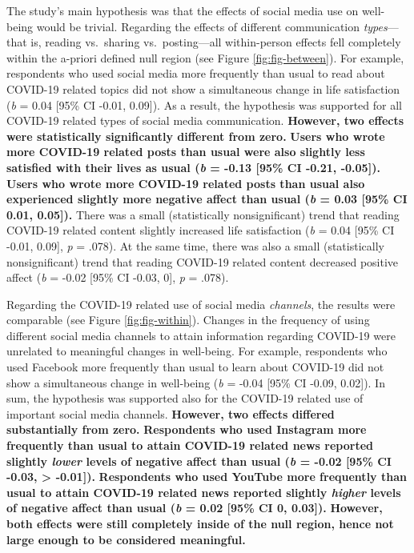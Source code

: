 \documentclass[
  man,mask]{apa7}
\begin{document}
The study's main hypothesis was that the effects of social media use on well-being would be trivial.
Regarding the effects of different communication \emph{types}---that is, reading vs.~sharing vs.~posting---all within-person effects fell completely within the a-priori defined null region (see Figure \ref{fig:fig-between}).
For example, respondents who used social media more frequently than usual to read about COVID-19 related topics did not show a simultaneous change in life satisfaction (\emph{b} = 0.04 {[}95\% CI -0.01, 0.09{]}).
As a result, the hypothesis was supported for all COVID-19 related types of social media communication.
\textbf{However, two effects were statistically significantly different from zero.}
\textbf{Users who wrote more COVID-19 related posts than usual were also slightly less satisfied with their lives as usual (\emph{b} = -0.13 {[}95\% CI -0.21, -0.05{]}).}
\textbf{Users who wrote more COVID-19 related posts than usual also experienced slightly more negative affect than usual (\emph{b} = 0.03 {[}95\% CI 0.01, 0.05{]}).}
There was a small (statistically nonsignificant) trend that reading COVID-19 related content slightly increased life satisfaction (\emph{b} = 0.04 {[}95\% CI -0.01, 0.09{]}, \emph{p} = .078).
At the same time, there was also a small (statistically nonsignificant) trend that reading COVID-19 related content decreased positive affect (\emph{b} = -0.02 {[}95\% CI -0.03, 0{]}, \emph{p} = .078).

Regarding the COVID-19 related use of social media \emph{channels}, the results were comparable (see Figure \ref{fig:fig-within}).
Changes in the frequency of using different social media channels to attain information regarding COVID-19 were unrelated to meaningful changes in well-being.
For example, respondents who used Facebook more frequently than usual to learn about COVID-19 did not show a simultaneous change in well-being (\emph{b} = -0.04 {[}95\% CI -0.09, 0.02{]}).
In sum, the hypothesis was supported also for the COVID-19 related use of important social media channels.
\textbf{However, two effects differed substantially from zero.}
\textbf{Respondents who used Instagram more frequently than usual to attain COVID-19 related news reported slightly \emph{lower} levels of negative affect than usual (\emph{b} = -0.02 {[}95\% CI -0.03, \textgreater{} -0.01{]}).}
\textbf{Respondents who used YouTube more frequently than usual to attain COVID-19 related news reported slightly \emph{higher} levels of negative affect than usual (\emph{b} = 0.02 {[}95\% CI 0, 0.03{]}).}
\textbf{However, both effects were still completely inside of the null region, hence not large enough to be considered meaningful.}
\end{document}
